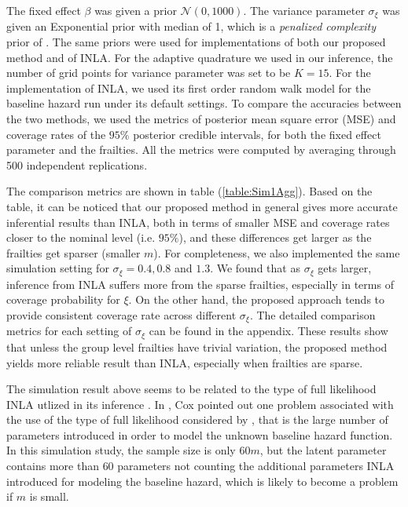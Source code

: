 \documentclass[ba]{imsart}
\begin{document}
The fixed effect $\beta$ was given a prior $\mathcal{N}(0,1000)$. The variance parameter $\sigma_\xi$ was given an Exponential prior with median of 1, which is a \emph{penalized complexity} prior of \cite{pcprior}. The same priors were used for implementations of both our proposed method and of INLA. For the adaptive quadrature we used in our inference, the number of grid points for variance parameter was set to be $K = 15$. For the implementation of INLA, we used its first order random walk model for the baseline hazard run under its default settings. To compare the accuracies between the two methods, we used the metrics of posterior mean square error (MSE) and coverage rates of the $95\%$ posterior credible intervals, for both the fixed effect parameter and the frailties. All the metrics were computed by averaging through 500 independent replications.

The comparison metrics are shown in table (\ref{table:Sim1Agg}). Based on the table, it can be noticed that our proposed method in general gives more accurate inferential results than INLA, both in terms of smaller MSE and coverage rates closer to the nominal level (i.e. $95\%$), and these differences get larger as the frailties get sparser (smaller $m$). 
For completeness, we also implemented the same simulation setting for $\sigma_\xi = 0.4, 0.8$ and $1.3$. We found that as $\sigma_\xi$ gets larger, inference from INLA suffers more from the sparse frailties, especially in terms of coverage probability for $\xi$. On the other hand, the proposed approach tends to provide consistent coverage rate across different $\sigma_\xi$. The detailed comparison metrics for each setting of $\sigma_\xi$ can be found in the appendix. These results show that unless the group level frailties have trivial variation, the proposed method yields more reliable result than INLA, especially when frailties are sparse.

The simulation result above seems to be related to the type of full likelihood INLA utlized in its inference \citep{inlacoxph}. In \cite{coxdiscussion}, Cox pointed out one problem associated with the use of the type of full likelihood considered by \cite{inlacoxph}, that is the large number of parameters introduced in order to model the unknown baseline hazard function. In this simulation study, the sample size is only $60m$, but the latent parameter contains more than $60$ parameters not counting the additional parameters INLA introduced for modeling the baseline hazard, which is likely to become a problem if $m$ is small. 
\end{document}
